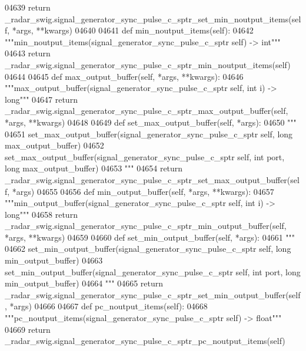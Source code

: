 \begin{DoxyCode}
{{{{{{{{{{{{{{{{04639         \textcolor{keywordflow}{return} \_radar\_swig.signal\_generator\_sync\_pulse\_c\_sptr\_set\_min\_noutput\_items(self, *args, **kwargs)
04640 
04641     \textcolor{keyword}{def }min_noutput_items(self):
04642         \textcolor{stringliteral}{"""min\_noutput\_items(signal\_generator\_sync\_pulse\_c\_sptr self) -> int"""}
04643         \textcolor{keywordflow}{return} \_radar\_swig.signal\_generator\_sync\_pulse\_c\_sptr\_min\_noutput\_items(self)
04644 
04645     \textcolor{keyword}{def }max_output_buffer(self, *args, **kwargs):
04646         \textcolor{stringliteral}{"""max\_output\_buffer(signal\_generator\_sync\_pulse\_c\_sptr self, int i) -> long"""}
04647         \textcolor{keywordflow}{return} \_radar\_swig.signal\_generator\_sync\_pulse\_c\_sptr\_max\_output\_buffer(self, *args, **kwargs)
04648 
04649     \textcolor{keyword}{def }set_max_output_buffer(self, *args):
04650         \textcolor{stringliteral}{"""}
04651 \textcolor{stringliteral}{        set\_max\_output\_buffer(signal\_generator\_sync\_pulse\_c\_sptr self, long max\_output\_buffer)}
04652 \textcolor{stringliteral}{        set\_max\_output\_buffer(signal\_generator\_sync\_pulse\_c\_sptr self, int port, long max\_output\_buffer)}
04653 \textcolor{stringliteral}{        """}
04654         \textcolor{keywordflow}{return} \_radar\_swig.signal\_generator\_sync\_pulse\_c\_sptr\_set\_max\_output\_buffer(self, *args)
04655 
04656     \textcolor{keyword}{def }min_output_buffer(self, *args, **kwargs):
04657         \textcolor{stringliteral}{"""min\_output\_buffer(signal\_generator\_sync\_pulse\_c\_sptr self, int i) -> long"""}
04658         \textcolor{keywordflow}{return} \_radar\_swig.signal\_generator\_sync\_pulse\_c\_sptr\_min\_output\_buffer(self, *args, **kwargs)
04659 
04660     \textcolor{keyword}{def }set_min_output_buffer(self, *args):
04661         \textcolor{stringliteral}{"""}
04662 \textcolor{stringliteral}{        set\_min\_output\_buffer(signal\_generator\_sync\_pulse\_c\_sptr self, long min\_output\_buffer)}
04663 \textcolor{stringliteral}{        set\_min\_output\_buffer(signal\_generator\_sync\_pulse\_c\_sptr self, int port, long min\_output\_buffer)}
04664 \textcolor{stringliteral}{        """}
04665         \textcolor{keywordflow}{return} \_radar\_swig.signal\_generator\_sync\_pulse\_c\_sptr\_set\_min\_output\_buffer(self, *args)
04666 
04667     \textcolor{keyword}{def }pc_noutput_items(self):
04668         \textcolor{stringliteral}{"""pc\_noutput\_items(signal\_generator\_sync\_pulse\_c\_sptr self) -> float"""}
04669         \textcolor{keywordflow}{return} \_radar\_swig.signal\_generator\_sync\_pulse\_c\_sptr\_pc\_noutput\_items(self)
}}}}}}}}}}}}}}}}
\end{DoxyCode}
